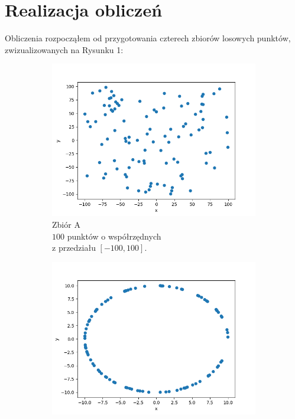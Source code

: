 \documentclass[11pt,a4paper]{article}
\begin{document}
\pagebreak

\section{Realizacja obliczeń}
Obliczenia rozpocząłem od przygotowania czterech zbiorów losowych punktów,
zwizualizowanych na Rysunku 1:

\begin{figure}[H]
    \centering
    \begin{subfigure}[b]{0.46\textwidth}
        \centering
        \includegraphics[scale=0.5]{res/points_a.png}
        \caption{
            Zbiór A 
            \\ 
            \footnotesize$100$ punktów o współrzędnych
            \\
            z przedziału $[-100, 100]$.
        }
    \end{subfigure}
    \begin{subfigure}[b]{0.46\textwidth}
        \centering
        \includegraphics[scale=0.5]{res/points_b.png}

\end{subfigure}
\end{figure}
\end{document}
